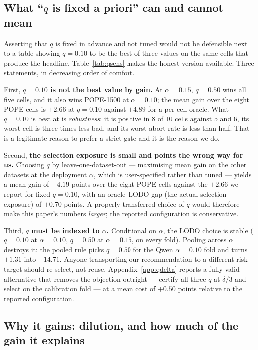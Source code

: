 \documentclass[review,number,doubleblind]{elsarticle}
\theoremstyle{plain}
\theoremstyle{definition}
\theoremstyle{remark}
\begin{document}
\subsection{What ``$q$ is fixed a priori'' can and cannot mean}
\label{sec:qsel}
Asserting that $q$ is fixed in advance and not tuned would not be defensible next to a table
showing $q=0.10$ to be the best of three values on the same cells that produce the headline.
Table~\ref{tab:qsens} makes the honest version available. Three statements, in decreasing order
of comfort.

First, \textbf{$q=0.10$ is not the best value by gain.} At $\alpha=0.15$, $q=0.50$ wins all
five cells, and it also wins POPE-1500 at $\alpha=0.10$; the mean gain over the eight POPE
cells is $+2.66$ at $q=0.10$ against $+4.89$ for a per-cell oracle. What $q=0.10$ is best at is
\emph{robustness}: it is positive in $8$ of $10$ cells against $5$ and $6$, its worst cell is
three times less bad, and its worst abort rate is less than half. That is a legitimate reason
to prefer a strict gate and it is the reason we do.

Second, \textbf{the selection exposure is small and points the wrong way for us.} Choosing $q$
by leave-one-dataset-out --- maximising mean gain on the other datasets at the deployment
$\alpha$, which is user-specified rather than tuned --- yields a mean gain of $+4.19$ points over
the eight POPE cells against the $+2.66$ we report for fixed $q=0.10$, with an oracle--LODO gap
(the actual selection exposure) of $+0.70$ points. A properly transferred choice of $q$ would
therefore make this paper's numbers \emph{larger}; the reported configuration is conservative.

Third, \textbf{$q$ must be indexed to $\alpha$.} Conditional on $\alpha$, the LODO choice is
stable ($q=0.10$ at $\alpha=0.10$, $q=0.50$ at $\alpha=0.15$, on every fold). Pooling across
$\alpha$ destroys it: the pooled rule picks $q=0.50$ for the Qwen $\alpha=0.10$ fold and turns
$+1.31$ into $-14.71$. Anyone transporting our recommendation to a different risk target should
re-select, not reuse. Appendix~\ref{app:qdelta} reports a fully valid alternative that removes
the objection outright --- certify all three $q$ at $\delta/3$ and select on the calibration fold
--- at a mean cost of $+0.50$ points relative to the reported configuration.

\subsection{Why it gains: dilution, and how much of the gain it explains}
\label{sec:mechanism}
\end{document}
